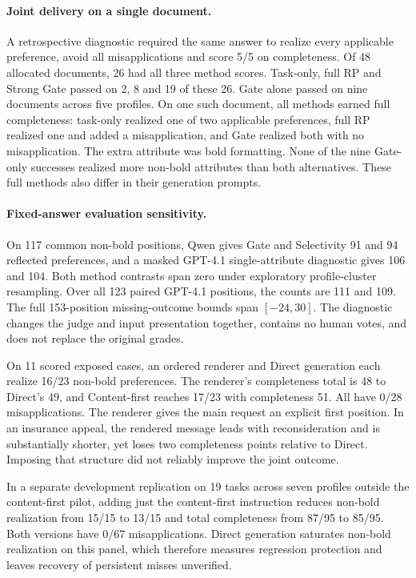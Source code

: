 \documentclass[11pt]{article}
\begin{document}
\paragraph{Joint delivery on a single document.}
A retrospective diagnostic required the same answer to realize every applicable preference, avoid all misapplications and score 5/5 on completeness. Of 48 allocated documents, 26 had all three method scores. Task-only, full RP and Strong Gate passed on 2, 8 and 19 of these 26. Gate alone passed on nine documents across five profiles. On one such document, all methods earned full completeness: task-only realized one of two applicable preferences, full RP realized one and added a misapplication, and Gate realized both with no misapplication. The extra attribute was bold formatting. None of the nine Gate-only successes realized more non-bold attributes than both alternatives. These full methods also differ in their generation prompts.

\paragraph{Fixed-answer evaluation sensitivity.}
On 117 common non-bold positions, Qwen gives Gate and Selectivity 91 and 94 reflected preferences, and a masked GPT-4.1 single-attribute diagnostic gives 106 and 104. Both method contrasts span zero under exploratory profile-cluster resampling. Over all 123 paired GPT-4.1 positions, the counts are 111 and 109. The full 153-position missing-outcome bounds span $[-24,30]$. The diagnostic changes the judge and input presentation together, contains no human votes, and does not replace the original grades.


On 11 scored exposed cases, an ordered renderer and Direct generation each realize 16/23 non-bold preferences. The renderer's completeness total is 48 to Direct's 49, and Content-first reaches 17/23 with completeness 51. All have 0/28 misapplications. The renderer gives the main request an explicit first position. In an insurance appeal, the rendered message leads with reconsideration and is substantially shorter, yet loses two completeness points relative to Direct. Imposing that structure did not reliably improve the joint outcome.

In a separate development replication on 19 tasks across seven profiles outside the content-first pilot, adding just the content-first instruction reduces non-bold realization from 15/15 to 13/15 and total completeness from 87/95 to 85/95. Both versions have 0/67 misapplications. Direct generation saturates non-bold realization on this panel, which therefore measures regression protection and leaves recovery of persistent misses unverified.
\end{document}
